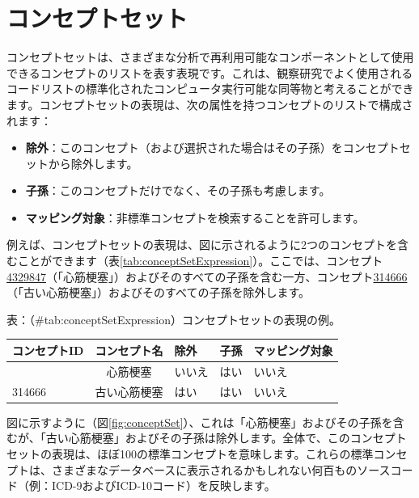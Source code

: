\documentclass[
  11pt]{book}
\providecommand{\tightlist}{%
  \setlength{\itemsep}{0pt}\setlength{\parskip}{0pt}}
\theoremstyle{definition}
\theoremstyle{definition}
\theoremstyle{definition}
\theoremstyle{definition}
\theoremstyle{remark}
\begin{document}
\section{コンセプトセット}\label{conceptSets}


コンセプトセットは、さまざまな分析で再利用可能なコンポーネントとして使用できるコンセプトのリストを表す表現です。これは、観察研究でよく使用されるコードリストの標準化されたコンピュータ実行可能な同等物と考えることができます。コンセプトセットの表現は、次の属性を持つコンセプトのリストで構成されます：

\begin{itemize}
\tightlist
\item
  \textbf{除外}：このコンセプト（および選択された場合はその子孫）をコンセプトセットから除外します。
\item
  \textbf{子孫}：このコンセプトだけでなく、その子孫も考慮します。
\item
  \textbf{マッピング対象}：非標準コンセプトを検索することを許可します。
\end{itemize}

例えば、コンセプトセットの表現は、図に示されるように2つのコンセプトを含むことができます（表\ref{tab:conceptSetExpression}）。ここでは、コンセプト\href{http://athena.ohdsi.org/search-terms/terms/4329847}{4329847}（「心筋梗塞」）およびそのすべての子孫を含む一方、コンセプト\href{http://athena.ohdsi.org/search-terms/terms/314666}{314666}（「古い心筋梗塞」）およびそのすべての子孫を除外します。

表：（\#tab:conceptSetExpression）コンセプトセットの表現の例。

\begin{longtable}[]{@{}lclll@{}}
\toprule\noalign{}
コンセプトID & コンセプト名 & 除外 & 子孫 & マッピング対象 \\
\midrule\noalign{}
\endhead
\bottomrule\noalign{}
\endlastfoot
4329847 & 心筋梗塞 & いいえ & はい & いいえ \\
314666 & 古い心筋梗塞 & はい & はい & いいえ \\
\end{longtable}

図に示すように（図\ref{fig:conceptSet}）、これは「心筋梗塞」およびその子孫を含むが、「古い心筋梗塞」およびその子孫は除外します。全体で、このコンセプトセットの表現は、ほぼ100の標準コンセプトを意味します。これらの標準コンセプトは、さまざまなデータベースに表示されるかもしれない何百ものソースコード（例：ICD-9およびICD-10コード）を反映します。
\end{document}
